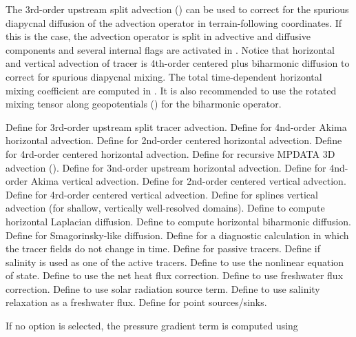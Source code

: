 \begin{klist}
The 3rd-order upstream split advection () can be used
to correct for the spurious diapycnal diffusion of the advection
operator in terrain-following coordinates. If this is the case, the
advection operator is split in advective and diffusive components
and several internal flags are activated in .  Notice
that horizontal and vertical advection of tracer is 4th-order centered
plus biharmonic diffusion to correct for spurious diapycnal mixing.
The total time-dependent horizontal mixing coefficient are computed
in . It is also recommended to use the rotated mixing
tensor along geopotentials () for the biharmonic
operator.
  \begin{klist}
     Define for 3rd-order upstream split
  tracer advection.
     Define for 4nd-order Akima horizontal advection.
     Define for 2nd-order centered horizontal
advection.
     Define for 4rd-order centered horizontal
advection.
     Define for recursive MPDATA 3D advection
    (\cite{Margolin_98}).
     Define for 3nd-order upstream horizontal advection.
     Define for 4nd-order Akima vertical advection.
     Define for 2nd-order centered vertical
advection.
     Define for 4rd-order centered vertical
advection.
     Define for splines vertical advection
 (for shallow, vertically well-resolved domains).
         Define to compute
  horizontal Laplacian diffusion.
         Define to compute
  horizontal biharmonic diffusion.
     Define for Smagorinsky-like diffusion.
      Define for a diagnostic
  calculation in which the tracer fields do not change in time.
      Define for passive tracers.
          Define if salinity is used as one of the
  active tracers.
     Define to use the nonlinear
  equation of state.
      Define to use the net heat
  flux correction.
      Define to use freshwater flux correction.
      Define to use solar radiation source term.
      Define to use salinity relaxation as a
  freshwater flux.
     Define for point sources/sinks.
  \end{klist}
   \mbox{}
If no option is selected, the pressure gradient term is computed using

\end{klist}
